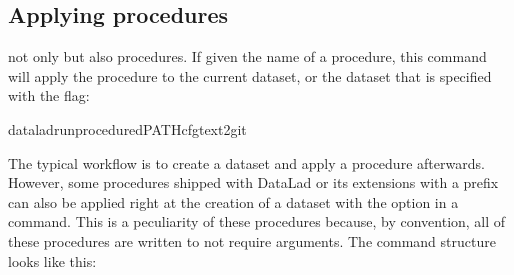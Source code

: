 \ignorespaces 

\subsection{Applying procedures}
\label{\detokenize{basics/101-124-procedures:applying-procedures}}\label{\detokenize{basics/101-124-procedures:index-2}}
\sphinxAtStartPar
{} not only 
but also  procedures. If given the name of
a procedure, this command will apply the procedure to
the current dataset, or the dataset that is specified
with the  flag:

\begin{sphinxVerbatim}[commandchars=\\\{\}]
dataladrun\PYGZhy{}procedure\PYG{o}{[}\PYGZhy{}d\PYGZlt{}PATH\PYGZgt{}\PYG{o}{]}cfg\PYGZus{}text2git
\end{sphinxVerbatim}

\ignorespaces 
\sphinxAtStartPar
The typical workflow is to create a dataset and apply
a procedure afterwards.
However, some procedures shipped with DataLad or its extensions with a
 prefix can also be applied right at the creation of a dataset
with the  option in a 
command. This is a peculiarity of these procedures because, by convention,
all of these procedures are written to not require arguments.
The command structure looks like this:

